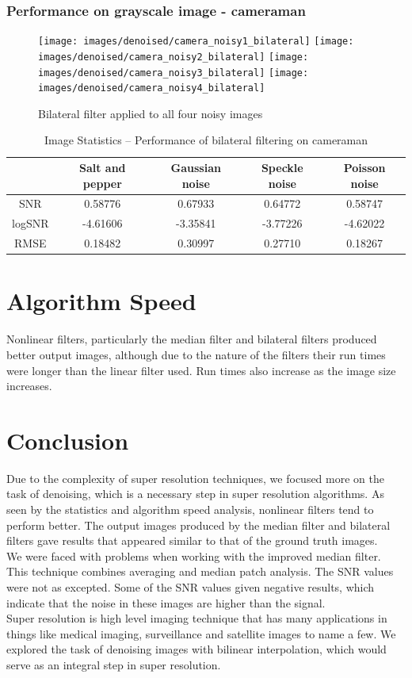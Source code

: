 \documentclass{article}
\begin{document}
\subsubsection{Performance on grayscale image - cameraman}
\begin{figure}[H]
  \centering
  \texttt{[image: images/denoised/camera\_noisy1\_bilateral]}
  \texttt{[image: images/denoised/camera\_noisy2\_bilateral]}
  \texttt{[image: images/denoised/camera\_noisy3\_bilateral]}
  \texttt{[image: images/denoised/camera\_noisy4\_bilateral]}
  \caption{Bilateral filter applied to all four noisy images}
\end{figure}
%
\begin{table}[H]
  \centering
  \begin{tabular}{c | c | c | c | c}
    & Salt and pepper & Gaussian noise & Speckle noise & Poisson noise \\
    \hline
    SNR    & 0.58776  & 0.67933  & 0.64772  & 0.58747  \\
    logSNR & -4.61606 & -3.35841 & -3.77226 & -4.62022 \\
    RMSE   & 0.18482  & 0.30997  & 0.27710  & 0.18267  \\
  \end{tabular}
  \caption{Image Statistics -- Performance of bilateral filtering on cameraman}
  \label{table:}
\end{table}
\section{Algorithm Speed}
Nonlinear filters, particularly the median filter and bilateral
filters produced better output images, although due to the nature of
the filters their run times were longer than the linear filter
used. Run times also increase as the image size increases. 
\section{Conclusion}
Due to the complexity of super resolution techniques, we focused more
on the task of denoising, which is a necessary step in super resolution
algorithms. As seen by the statistics and algorithm speed analysis,
nonlinear filters tend to perform better. The output images produced
by the median filter and bilateral filters gave results that appeared
similar to that of the ground truth images. \\

We were faced with problems when working with the improved median
filter. This technique combines averaging and median patch
analysis. The SNR values were not as excepted. Some of the SNR values
given negative results, which indicate that the noise in these images
are higher than the signal. \\

Super resolution is high level imaging technique that has many
applications in things like medical imaging, surveillance and
satellite images to name a few. We explored the task of denoising
images with bilinear interpolation, which would serve as an integral
step in super resolution. 

\newpage
\printbibliography
\end{document}
